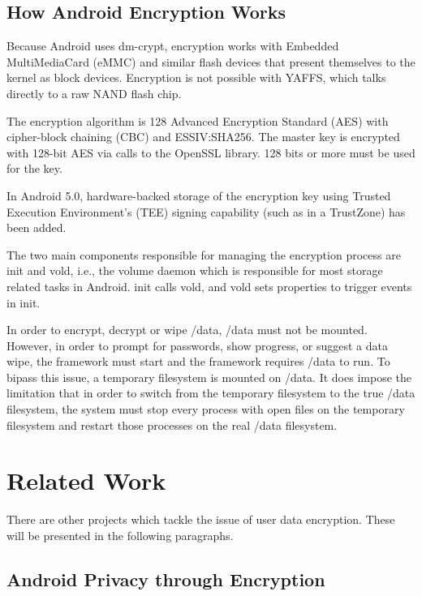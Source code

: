\subsection{How Android Encryption Works}
\label{sub-sec:and-enc-works}

Because Android uses dm-crypt, encryption works with Embedded MultiMediaCard (eMMC) and similar flash devices that present themselves to the kernel as block devices. Encryption is not possible with YAFFS, which talks directly to a raw NAND flash chip.

The encryption algorithm is 128 Advanced Encryption Standard (AES) with cipher-block chaining (CBC) and ESSIV:SHA256. The master key is encrypted with 128-bit AES via calls to the OpenSSL library. 128 bits or more must be used for the key.

In Android 5.0, hardware-backed storage of the encryption key using Trusted Execution Environment’s (TEE) signing capability (such as in a TrustZone) has been added.

The two main components responsible for managing the encryption process are init and vold, i.e., the volume daemon which is responsible for most storage related tasks in Android. init calls vold, and vold sets properties to trigger events in init.

In order to encrypt, decrypt or wipe /data, /data must not be mounted. However, in order to prompt for passwords, show progress, or suggest a data wipe, the framework must start and the framework requires /data to run. To bipass this issue, a temporary filesystem is mounted on /data. It does impose the limitation that in order to switch from the temporary filesystem to the true /data filesystem, the system must stop every process with open files on the temporary filesystem and restart those processes on the real /data filesystem. 

\newpage
\section{Related Work}
\label{sec:related-work}

There are other projects which tackle the issue of user data encryption. These will be presented in the following paragraphs.

\subsection{Android Privacy through Encryption}
\label{sub-sec:and-priv-defreez}

